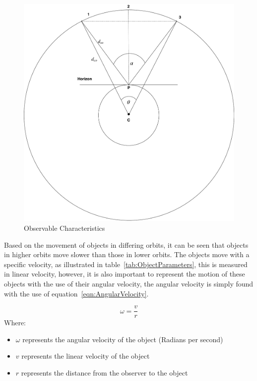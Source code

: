 \documentclass[11pt]{witseiepaper}
\begin{document}
\begin{center}
    \begin{figure}
        \includegraphics[width=\textwidth]{ObservableCharacteristics.pdf}
        \caption{Observable Characteristics}
        \label{fig:ObservableCharacteristics}    
    \end{figure}
\end{center}


Based on the movement of objects in differing orbits, it can be seen that objects in higher orbits move slower than those in lower orbits.
The objects move with a specific velocity, as illustrated in table~\ref{tab:ObjectParameters}, this is measured in linear velocity, however, it is also important to represent the motion of these objects with the use of their angular velocity, the angular velocity is simply found with the use of equation~\ref{eqn:AngularVelocity}.

\begin{equation} \label{eqn:AngularVelocity}
\omega = \frac{v}{r}
\end{equation}
Where:
\begin{itemize}
    \item $\omega$ represents the angular velocity of the object (Radians per second)
    \item $v$ represents the linear velocity of the object
    \item $r$ represents the distance from the observer to the object
\end{itemize}
\end{document}
